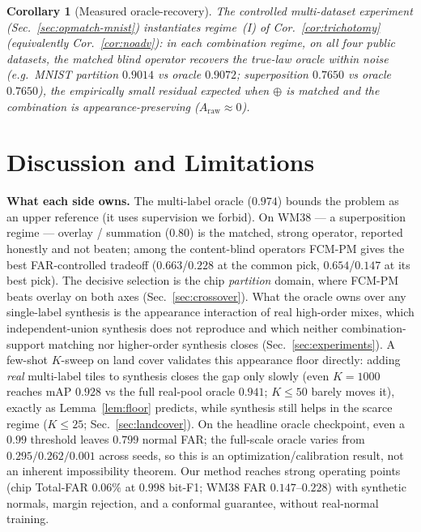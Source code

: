 \documentclass[11pt]{article}
\newtheorem{corollary}{Corollary}
\begin{document}
\begin{corollary}[Measured oracle-recovery]\label{cor:oraclerecover}
The controlled multi-dataset experiment (Sec.~\ref{sec:opmatch-mnist}) instantiates
regime~(I) of Cor.~\ref{cor:trichotomy} (equivalently Cor.~\ref{cor:noadv}): in each combination
regime, on all four public datasets, the matched blind operator recovers the true-law oracle
within noise (e.g.\ MNIST partition $0.9014$ vs oracle $0.9072$; superposition $0.7650$ vs
oracle $0.7650$), the empirically small residual expected when $\oplus$ is matched and the
combination is appearance-preserving ($A_{\mathrm{raw}}\approx0$).
\end{corollary}

\section{Discussion and Limitations}\label{sec:discussion}

\textbf{What each side owns.} The multi-label oracle ($0.974$) bounds the problem as
an upper reference (it uses supervision we forbid). On WM38 --- a superposition regime
--- overlay / summation ($0.80$) is the matched, strong operator, reported honestly and
not beaten; among the content-blind operators FCM-PM gives the best FAR-controlled
tradeoff ($0.663$/$0.228$ at the common pick, $0.654$/$0.147$ at its best pick). The
decisive selection is the chip \emph{partition} domain, where FCM-PM beats overlay on
both axes (Sec.~\ref{sec:crossover}). What the oracle owns over any single-label
synthesis is the appearance interaction of real high-order mixes, which
independent-union synthesis does not reproduce and which neither combination-support
matching nor higher-order synthesis closes (Sec.~\ref{sec:experiments}). A few-shot
$K$-sweep on land cover validates this appearance floor directly: adding \emph{real}
multi-label tiles to synthesis closes the gap only slowly (even $K{=}1000$ reaches mAP
$0.928$ vs the full real-pool oracle $0.941$; $K\le50$ barely moves it), exactly as
Lemma~\ref{lem:floor} predicts, while synthesis still helps in the scarce regime
($K\le25$; Sec.~\ref{sec:landcover}). On the
headline oracle checkpoint, even a $0.99$ threshold leaves $0.799$ normal FAR; the
full-scale oracle varies from $0.295/0.262/0.001$ across seeds, so this is an
optimization/calibration result, not an inherent impossibility theorem. Our method
reaches strong operating points (chip Total-FAR $0.06\%$ at $0.998$ bit-F1; WM38 FAR
$0.147$--$0.228$) with synthetic normals, margin rejection, and a conformal guarantee,
without real-normal training.
\end{document}
